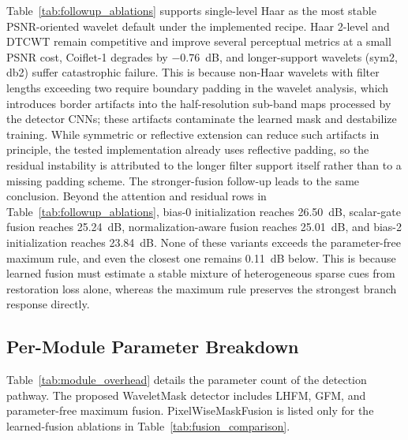 {Table~\ref{tab:followup_ablations} supports single-level Haar as the most stable PSNR-oriented wavelet default under the implemented recipe. Haar 2-level and DTCWT remain competitive and improve several perceptual metrics at a small PSNR cost, Coiflet-1 degrades by $-0.76$~dB, and longer-support wavelets (sym2, db2) suffer catastrophic failure. This is because non-Haar wavelets with filter lengths exceeding two require boundary padding in the wavelet analysis, which introduces border artifacts into the half-resolution sub-band maps processed by the detector CNNs; these artifacts contaminate the learned mask and destabilize training. While symmetric or reflective extension can reduce such artifacts in principle, the tested implementation already uses reflective padding, so the residual instability is attributed to the longer filter support itself rather than to a missing padding scheme. The stronger-fusion follow-up leads to the same conclusion. Beyond the attention and residual rows in Table~\ref{tab:followup_ablations}, bias-0 initialization reaches 26.50~dB, scalar-gate fusion reaches 25.24~dB, normalization-aware fusion reaches 25.01~dB, and bias-2 initialization reaches 23.84~dB. None of these variants exceeds the parameter-free maximum rule, and even the closest one remains 0.11~dB below. This is because learned fusion must estimate a stable mixture of heterogeneous sparse cues from restoration loss alone, whereas the maximum rule preserves the strongest branch response directly.

\subsection{Per-Module Parameter Breakdown}\label{subsec:module_overhead}

Table~\ref{tab:module_overhead} details the parameter count of the detection pathway. The proposed WaveletMask detector includes LHFM, GFM, and parameter-free maximum fusion. PixelWiseMaskFusion is listed only for the learned-fusion ablations in Table~\ref{tab:fusion_comparison}.

}
